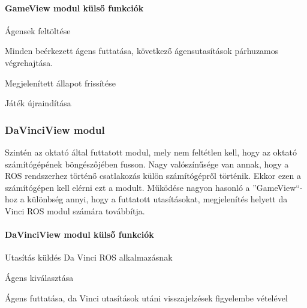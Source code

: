\documentclass[12pt,a4paper,oneside]{report} %
\begin{document}
\paragraph{GameView modul külső funkciók}
\begin{compactitem}
	\item Ágensek feltöltése
	\item Minden beérkezett ágens futtatása, következő ágensutasítások párhuzamos végrehajtása.
	\item Megjelenített állapot frissítése
	\item Játék újraindítása
\end{compactitem}

\subsubsection{DaVinciView modul}
Szintén az oktató által futtatott modul, mely nem feltétlen kell, hogy az oktató számítógépének böngészőjében fusson. Nagy valószínűsége van annak, hogy a ROS rendszerhez történő csatlakozás külön számítógépről történik. Ekkor ezen a számítógépen kell elérni ezt a modult. Működése nagyon hasonló a ''GameView``-hoz a különbség annyi, hogy a futtatott utasításokat, megjelenítés helyett da Vinci ROS modul számára továbbítja.

\paragraph{DaVinciView modul külső funkciók}
\begin{compactitem}
	\item Utasítás küldés Da Vinci ROS alkalmazásnak
	\item Ágens kiválasztása
	\item Ágens futtatása, da Vinci utasítások utáni visszajelzések figyelembe vételével
\end{compactitem}
\end{document}

